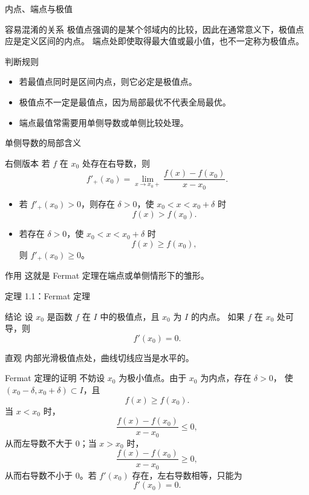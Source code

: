 \documentclass[aspectratio=169,10pt]{ctexbeamer}
\begin{document}
\begin{frame}{内点、端点与极值}
\small
\begin{block}{容易混淆的关系}
极值点强调的是某个邻域内的比较，因此在通常意义下，极值点应是定义区间的内点。
端点处即使取得最大值或最小值，也不一定称为极值点。
\end{block}

\begin{alertblock}{判断规则}
\begin{itemize}
  \item 若最值点同时是区间内点，则它必定是极值点。
  \item 极值点不一定是最值点，因为局部最优不代表全局最优。
  \item 端点最值常需要用单侧导数或单侧比较处理。
\end{itemize}
\end{alertblock}
\end{frame}

\begin{frame}{单侧导数的局部含义}
\small
\begin{block}{右侧版本}
若 $f$ 在 $x_0$ 处存在右导数，则
\[
  f'_+(x_0)=\lim_{x\to x_0+}\frac{f(x)-f(x_0)}{x-x_0}.
\]
\begin{itemize}
  \item 若 $f'_+(x_0)>0$，则存在 $\delta>0$，使 $x_0<x<x_0+\delta$ 时
  \[
    f(x)>f(x_0).
  \]
  \item 若存在 $\delta>0$，使 $x_0<x<x_0+\delta$ 时
  \[
    f(x)\ge f(x_0),
  \]
  则 $f'_+(x_0)\ge0$。
\end{itemize}
\end{block}
\begin{alertblock}{作用}
这就是 Fermat 定理在端点或单侧情形下的雏形。
\end{alertblock}
\end{frame}

\begin{frame}{定理 1.1：Fermat 定理}
\small
\begin{block}{结论}
设 $x_0$ 是函数 $f$ 在 $I$ 中的极值点，且 $x_0$ 为 $I$ 的内点。
如果 $f$ 在 $x_0$ 处可导，则
\[
  f'(x_0)=0.
\]
\end{block}
\begin{alertblock}{直观}
内部光滑极值点处，曲线切线应当是水平的。
\end{alertblock}
\end{frame}

\begin{frame}{Fermat 定理的证明}
\small
不妨设 $x_0$ 为极小值点。由于 $x_0$ 为内点，存在 $\delta>0$，
使 $(x_0-\delta,x_0+\delta)\subset I$，且
\[
  f(x)\ge f(x_0).
\]
当 $x<x_0$ 时，
\[
  \frac{f(x)-f(x_0)}{x-x_0}\le0,
\]
从而左导数不大于 $0$；当 $x>x_0$ 时，
\[
  \frac{f(x)-f(x_0)}{x-x_0}\ge0,
\]
从而右导数不小于 $0$。若 $f'(x_0)$ 存在，左右导数相等，只能为
\[
  f'(x_0)=0.
\]
\end{frame}
\end{document}
